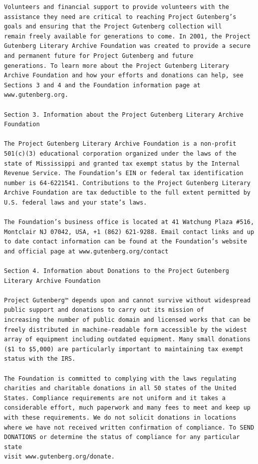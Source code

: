 \documentclass{article}
\begin{document}
\begin{verbatim}
Volunteers and financial support to provide volunteers with the
assistance they need are critical to reaching Project Gutenberg’s
goals and ensuring that the Project Gutenberg collection will
remain freely available for generations to come. In 2001, the Project
Gutenberg Literary Archive Foundation was created to provide a secure
and permanent future for Project Gutenberg and future
generations. To learn more about the Project Gutenberg Literary
Archive Foundation and how your efforts and donations can help, see
Sections 3 and 4 and the Foundation information page at www.gutenberg.org.

Section 3. Information about the Project Gutenberg Literary Archive Foundation

The Project Gutenberg Literary Archive Foundation is a non-profit
501(c)(3) educational corporation organized under the laws of the
state of Mississippi and granted tax exempt status by the Internal
Revenue Service. The Foundation’s EIN or federal tax identification
number is 64-6221541. Contributions to the Project Gutenberg Literary
Archive Foundation are tax deductible to the full extent permitted by
U.S. federal laws and your state’s laws.

The Foundation’s business office is located at 41 Watchung Plaza #516,
Montclair NJ 07042, USA, +1 (862) 621-9288. Email contact links and up
to date contact information can be found at the Foundation’s website
and official page at www.gutenberg.org/contact

Section 4. Information about Donations to the Project Gutenberg
Literary Archive Foundation

Project Gutenberg™ depends upon and cannot survive without widespread
public support and donations to carry out its mission of
increasing the number of public domain and licensed works that can be
freely distributed in machine-readable form accessible by the widest
array of equipment including outdated equipment. Many small donations
($1 to $5,000) are particularly important to maintaining tax exempt
status with the IRS.

The Foundation is committed to complying with the laws regulating
charities and charitable donations in all 50 states of the United
States. Compliance requirements are not uniform and it takes a
considerable effort, much paperwork and many fees to meet and keep up
with these requirements. We do not solicit donations in locations
where we have not received written confirmation of compliance. To SEND
DONATIONS or determine the status of compliance for any particular state
visit www.gutenberg.org/donate.


\end{verbatim}
\end{document}
